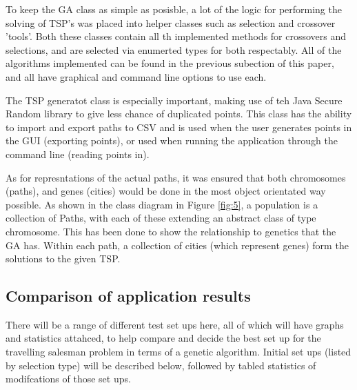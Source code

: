 \documentclass[article]{IEEEtran}
\begin{document}
To keep the GA class as simple as posisble, a lot of the logic for performing the solving of TSP's was placed into helper classes such as selection and crossover 'tools'. Both these classes contain all th implemented methods for crossovers and selections, and are selected via enumerted types for both respectably. All of the algorithms implemented can be found in the previous subection of this paper, and all have graphical and command line options to use each. \par
The TSP generatot class is especially important, making use of teh Java Secure Random library to give less chance of duplicated points. This class has the ability to import and export paths to CSV and is used when the user generates points in the GUI (exporting points), or used when running the application through the command line (reading points in).\par
As for represntations of the actual paths, it was ensured that both chromosomes (paths), and genes (cities) would be done in the most object orientated way possible. As shown in the class diagram in Figure \ref{fig:5}, a population is a collection of Paths, with each of these extending an abstract class of type chromosome. This has been done to show the relationship to genetics that the GA has. Within each path, a collection of cities (which represent genes) form the solutions to the given TSP. \par

\subsection{Comparison of application results}
There will be a range of different test set ups here, all of which will have graphs and statistics attahced, to help compare and decide the best set up for the travelling salesman problem in terms of a genetic algorithm. Initial set ups (listed by selection type) will be described below, followed by tabled statistics of modifcations of those set ups.
\end{document}
